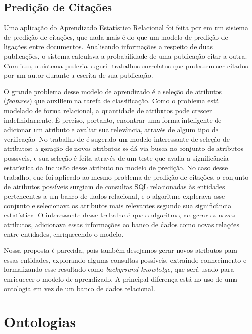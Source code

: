 \subsection{Predição de Citações}
\label{ssec:srl}

Uma aplicação do Aprendizado Estatístico Relacional foi feita por \citet{Popescul2003} em um sistema de predição de citações, que nada mais é do que um modelo de predição de ligações entre documentos. Analisando informações a respeito de duas publicações, o sistema calculava a probabilidade de uma publicação citar a outra. Com isso, o sistema poderia sugerir trabalhos correlatos que pudessem ser citados por um autor durante a escrita de sua publicação.

O grande problema desse modelo de aprendizado é a seleção de atributos (\textit{features}) que auxiliem na tarefa de classificação. Como o problema está modelado de forma relacional, a quantidade de atributos pode crescer indefinidamente. É preciso, portanto, encontrar uma forma inteligente de adicionar um atributo e avaliar sua relevância, através de algum tipo de verificação. No trabalho de \citet{Popescul2007} é sugerido um modelo interessante de seleção de atributos: a geração de novos atributos se dá via busca no conjunto de atributos possíveis, e sua seleção é feita através de um teste que avalia a significância estatística da inclusão desse atributo no modelo de predição. No caso desse trabalho, que foi aplicado ao mesmo problema de predição de citações, o conjunto de atributos possíveis surgiam de consultas SQL relacionadas às entidades pertencentes a um banco de dados relacional, e o algoritmo explorava esse conjunto e selecionava os atributos mais relevantes segundo sua significância estatística. O interessante desse trabalho é que o algoritmo, ao gerar os novos atributos, adicionava essas informações ao banco de dados como novas relações entre entidades, enriquecendo o modelo.

Nossa proposta é parecida, pois também desejamos gerar novos atributos para essas entidades, explorando algums consultas possíveis, extraindo conhecimento e formalizando esse resultado como \textit{background knowledge}, que será usado para enriquecer o modelo de aprendizado.  A principal diferença está no uso de uma ontologia em vez de um banco de dados relacional.


\section{Ontologias}
\label{sec:ontologias}

